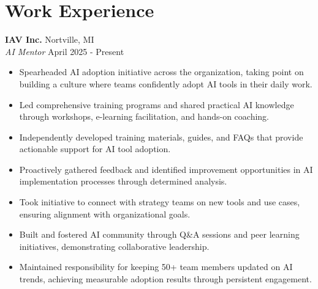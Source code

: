 \section*{Work Experience}

\noindent
\textbf{IAV Inc.} \hfill Nortville, MI \\
\textit{AI Mentor} \hfill April 2025 - Present \\
\begin{itemize}[leftmargin=*,noitemsep,topsep=3pt]
    \item Spearheaded AI adoption initiative across the organization, taking point on building a culture where teams confidently adopt AI tools in their daily work.
    \item Led comprehensive training programs and shared practical AI knowledge through workshops, e-learning facilitation, and hands-on coaching.
    \item Independently developed training materials, guides, and FAQs that provide actionable support for AI tool adoption.
    \item Proactively gathered feedback and identified improvement opportunities in AI implementation processes through determined analysis.
    \item Took initiative to connect with strategy teams on new tools and use cases, ensuring alignment with organizational goals.
    \item Built and fostered AI community through Q\&A sessions and peer learning initiatives, demonstrating collaborative leadership.
    \item Maintained responsibility for keeping 50+ team members updated on AI trends, achieving measurable adoption results through persistent engagement.
\end{itemize}

\vspace{0.5em}

